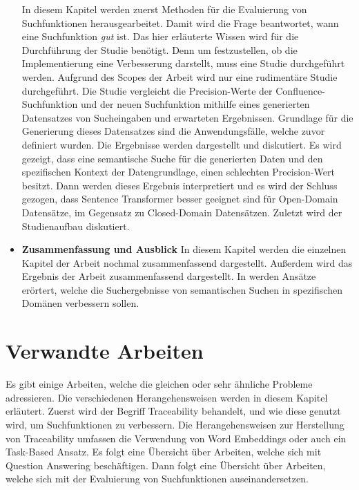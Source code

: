 \begin{itemize}
         In diesem Kapitel werden zuerst Methoden für die Evaluierung von Suchfunktionen herausgearbeitet.
         Damit wird die Frage beantwortet, wann eine Suchfunktion \textit{gut} ist.
         Das hier erläuterte Wissen wird für die Durchführung der Studie benötigt.
         Denn um festzustellen, ob die Implementierung eine Verbesserung darstellt, muss eine Studie durchgeführt werden.
         Aufgrund des Scopes der Arbeit wird nur eine rudimentäre Studie durchgeführt.
         Die Studie vergleicht die Precision-Werte der Confluence-Suchfunktion und der neuen Suchfunktion mithilfe eines generierten Datensatzes von Sucheingaben und erwarteten Ergebnissen.
         Grundlage für die Generierung dieses Datensatzes sind die Anwendungsfälle, welche zuvor definiert wurden.
         Die Ergebnisse werden dargestellt und diskutiert.
         Es wird gezeigt, dass eine semantische Suche für die generierten Daten und den spezifischen Kontext der Datengrundlage, einen schlechten Precision-Wert besitzt. 
         Dann werden dieses Ergebnis interpretiert und es wird der Schluss gezogen, dass Sentence Transformer besser geeignet sind für Open-Domain Datensätze, im Gegensatz zu Closed-Domain Datensätzen.
         Zuletzt wird der Studienaufbau diskutiert.
    \item \textbf{Zusammenfassung und Ausblick}
         In diesem Kapitel werden die einzelnen Kapitel der Arbeit nochmal zusammenfassend dargestellt.
         Außerdem wird das Ergebnis der Arbeit zusammenfassend dargestellt.
         In  werden Ansätze erörtert, welche die Suchergebnisse von semantischen Suchen in spezifischen Domänen verbessern sollen.
\end{itemize}

\section{Verwandte Arbeiten}
Es gibt einige Arbeiten, welche die gleichen oder sehr ähnliche Probleme adressieren.
Die verschiedenen Herangehensweisen werden in diesem Kapitel erläutert.
Zuerst wird der Begriff Traceability behandelt, und wie diese genutzt wird, um Suchfunktionen zu verbessern.
Die Herangehensweisen zur Herstellung von Traceability umfassen die Verwendung von Word Embeddings oder auch ein Task-Based Ansatz.
Es folgt eine Übersicht über Arbeiten, welche sich mit Question Answering beschäftigen.
Dann folgt eine Übersicht über Arbeiten, welche sich mit der Evaluierung von Suchfunktionen auseinandersetzen.

